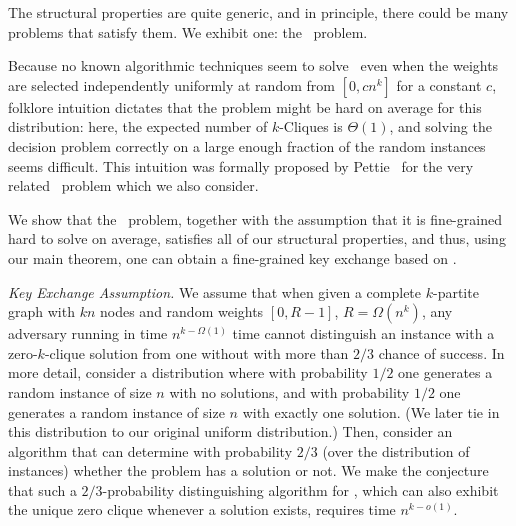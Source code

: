 

The structural properties are quite generic, and in principle, there could be many problems that satisfy them. We exhibit one: the \zkclique~problem.

Because no known algorithmic techniques seem to solve \zkclique~even when the weights are selected independently uniformly at random from $[0,cn^k]$ for a constant $c$, folklore intuition dictates that the problem might be hard on average for this distribution: here, the expected number of $k$-Cliques is $\Theta(1)$, and solving the decision problem correctly on a large enough fraction of the random instances seems difficult.
This intuition was formally proposed by Pettie~\cite{avgCase3Sum} for the very related \kSum~problem which we also consider.

We show that the \zkclique~problem, together with the assumption that it is fine-grained hard to solve on average, satisfies all of our structural properties, and thus, using our main theorem, one can obtain a fine-grained key exchange based on 
\zkclique.

\textit{Key Exchange Assumption.} We assume that when given a complete $k$-partite graph with $kn$ nodes and random weights $[0,R-1]$, $R = \Omega(n^k)$, any adversary running in time $n^{k-\Omega(1)}$ time cannot distinguish an instance with a zero-$k$-clique solution from one without with more than $2/3$ chance of success.
In more detail, consider a distribution where with probability $1/2$ one generates a random instance of size $n$ with no solutions, and with probability $1/2$ one generates a random instance of size $n$ with exactly one solution. (We later tie in this distribution to our original uniform distribution.) Then, consider an algorithm that can determine with probability $2/3$ (over the distribution of instances) whether the problem has a solution or not.
We make the conjecture that such a $2/3$-probability distinguishing algorithm for \zkclique, which can also exhibit the unique zero clique whenever a solution exists, 
requires time $n^{k-o(1)}$.



